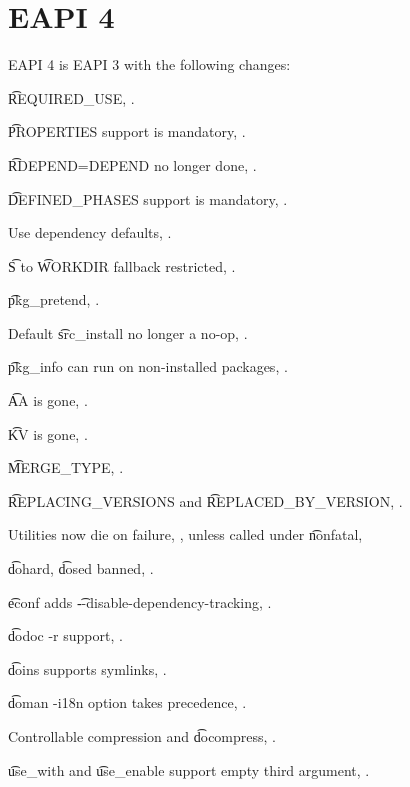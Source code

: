 \section*{EAPI 4}

EAPI 4 is EAPI 3 with the following changes:

\begin{compactitem}
\item \t{REQUIRED_USE}, .
\item \t{PROPERTIES} support is mandatory, .
\item \t{RDEPEND=DEPEND} no longer done, .
\item \t{DEFINED_PHASES} support is mandatory, .
\item Use dependency defaults, .
\item \t{S} to \t{WORKDIR} fallback restricted, .
\item \t{pkg_pretend}, .
\item Default \t{src_install} no longer a no-op, .
\item \t{pkg_info} can run on non-installed packages, .
\item \t{AA} is gone, .
\item \t{KV} is gone, .
\item \t{MERGE_TYPE}, .
\item \t{REPLACING_VERSIONS} and \t{REPLACED_BY_VERSION}, .
\item Utilities now die on failure, , unless called under \t{nonfatal},
\item \t{dohard}, \t{dosed} banned, .
\item \t{econf} adds \t{-{}-disable-dependency-tracking}, .
\item \t{dodoc -r} support, .
\item \t{doins} supports symlinks, .
\item \t{doman -i18n} option takes precedence, .
\item Controllable compression and \t{docompress}, .
\item \t{use_with} and \t{use_enable} support empty third argument, .
\end{compactitem}

